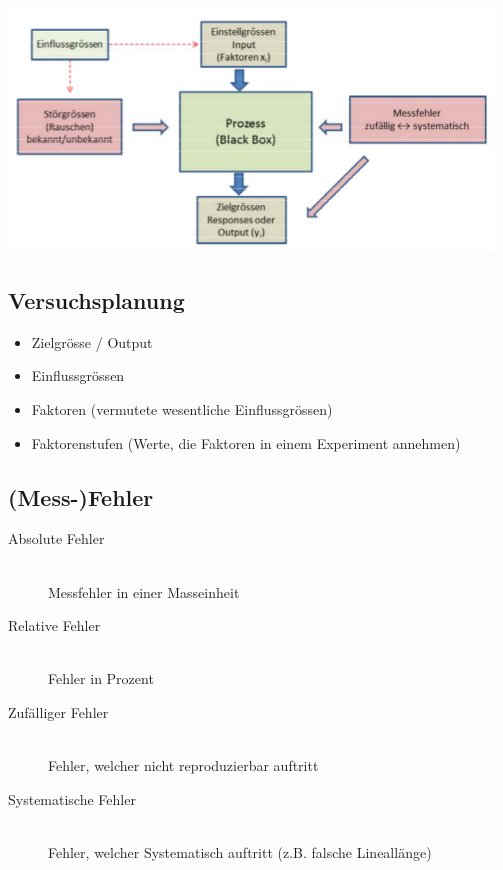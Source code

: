 	\includegraphics[scale=0.75]{img/prozessmodell.png}

\subsection{Versuchsplanung}

\begin{itemize}
	\item	Zielgrösse / Output
	\item	Einflussgrössen
	\item	Faktoren (vermutete wesentliche Einflussgrössen)
	\item	Faktorenstufen (Werte, die Faktoren in einem Experiment annehmen)
\end{itemize}

\subsection{(Mess-)Fehler}

\begin{description}
	\item[Absolute Fehler] \hfill \\
		Messfehler in einer Masseinheit
	\item[Relative Fehler] \hfill \\
		Fehler in Prozent
	\item[Zufälliger Fehler] \hfill \\
		Fehler, welcher nicht reproduzierbar auftritt
	\item[Systematische Fehler] \hfill \\
		Fehler, welcher Systematisch auftritt (z.B. falsche Lineallänge)
\end{description}


